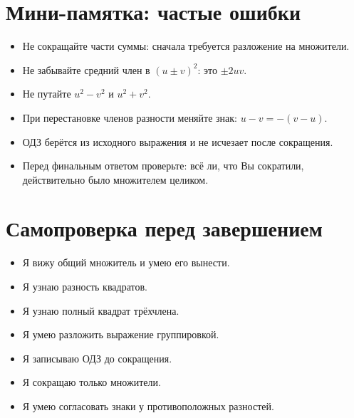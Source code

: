 \documentclass[a4paper,12pt]{article}
\begin{document}
\section*{Мини-памятка: частые ошибки}
\begin{itemize}
  \item Не сокращайте части суммы: сначала требуется разложение на множители.
  \item Не забывайте средний член в $(u\pm v)^2$: это $\pm2uv$.
  \item Не путайте $u^2-v^2$ и $u^2+v^2$.
  \item При перестановке членов разности меняйте знак: $u-v=-(v-u)$.
  \item ОДЗ берётся из исходного выражения и не исчезает после сокращения.
  \item Перед финальным ответом проверьте: всё ли, что Вы сократили, действительно было множителем целиком.
\end{itemize}

\section*{Самопроверка перед завершением}
\begin{itemize}
  \item[$\square$] Я вижу общий множитель и умею его вынести.
  \item[$\square$] Я узнаю разность квадратов.
  \item[$\square$] Я узнаю полный квадрат трёхчлена.
  \item[$\square$] Я умею разложить выражение группировкой.
  \item[$\square$] Я записываю ОДЗ до сокращения.
  \item[$\square$] Я сокращаю только множители.
  \item[$\square$] Я умею согласовать знаки у противоположных разностей.
\end{itemize}

\clearpage
\end{document}
